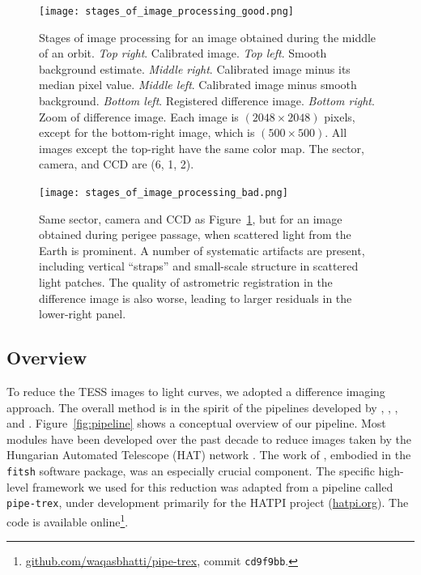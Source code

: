 \documentclass[12pt,twocolumn,tighten]{aastex62}
\begin{document}
\begin{figure}[!t]
    \begin{center}
        \leavevmode
        \texttt{[image: stages\_of\_image\_processing\_good.png]}
    \end{center}
    \vspace{-0.6cm}
    \caption{
        Stages of image processing for an image obtained during the middle
        of an orbit.
        {\it Top right}. Calibrated image.
        {\it Top left}. Smooth background estimate.
        {\it Middle right}. Calibrated image minus its median pixel value.
        {\it Middle left}. Calibrated image minus smooth background.
        {\it Bottom left}. Registered difference image.
        {\it Bottom right}. Zoom of difference image.
        Each image is $(2048\times2048)$ pixels, except for the bottom-right 
        image, which is $(500\times500)$.
        All images except the top-right have the same color map.
        The sector, camera, and CCD are (6, 1, 2).
        \label{fig:stages_good}
    }
\end{figure}

\begin{figure}[!t]
    \begin{center}
        \leavevmode
        \texttt{[image: stages\_of\_image\_processing\_bad.png]}
    \end{center}
    \vspace{-0.6cm}
    \caption{
        Same sector, camera and CCD as Figure~\ref{fig:stages_good}, but for an image obtained during
        perigee passage, when scattered light from the Earth is
        prominent.
        A number of systematic artifacts are present,
        including vertical ``straps'' and small-scale structure in scattered light
        patches.
        The quality of astrometric registration in the difference image is also
        worse, leading to larger residuals in the lower-right panel.
        \label{fig:stages_bad}
    }
\end{figure}

\subsection{Overview}

To reduce the TESS images to light curves, we adopted a
difference imaging approach.  The overall method is in the spirit of the
pipelines developed by \citet{Pal_2009},
\citet{huang_high-precision_2015}, \citet{soares-furtado_image_2017}, \citet{oelkers_precision_2018} and \citet{wallace_search_2019}.
Figure~\ref{fig:pipeline} shows a conceptual overview of
our pipeline.  Most modules have been
developed over the past decade to reduce
images taken by the Hungarian Automated Telescope (HAT) network \citep{bakos_hat_review_2018}.
The work of \citet{Pal_2009}, embodied in the \texttt{fitsh} software package,
was an especially crucial component.
The specific high-level framework
we used for this reduction was adapted from a pipeline called
\texttt{pipe-trex}, under development primarily for the HATPI project
(\url{hatpi.org}).  The code is available
online\footnote{\url{github.com/waqasbhatti/pipe-trex}, commit
\texttt{cd9f9bb}.}.
\end{document}
